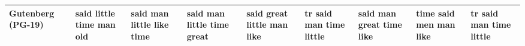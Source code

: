 \documentclass[11pt,a4paper]{article}
\begin{document}
\begin{appendices}
\begin{table*}[htb]
\begin{tiny}
\begin{tabular}{|p{}|p{}|p{}|p{}|p{}|p{}|p{}|p{}|p{}|}
    Gutenberg (PG-19) & said \newline little \newline time \newline man \newline old & said \newline man \newline little \newline like \newline time & said \newline man \newline little \newline time \newline great & said \newline great \newline little \newline man \newline like & tr \newline said \newline man \newline time \newline little & said \newline man \newline great \newline time \newline like & time \newline said \newline men \newline man \newline like & tr \newline said \newline man \newline time \newline little\\\hline

\end{tabular}
\end{tiny}
\end{table*}
\end{appendices}
\end{document}
